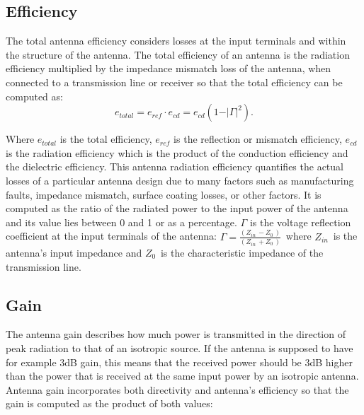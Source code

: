 


\subsection{Efficiency}

The total antenna efficiency considers losses at the input terminals and within the structure of the antenna. The total efficiency of an antenna is the radiation efficiency multiplied by the impedance mismatch loss of the antenna, when connected to a transmission line or receiver so that the total efficiency can be computed as:
\begin{equation}
e_{total}= e_{ref} \cdot e_{cd}= e_{cd} \left( 1- \vert  \Gamma  \vert ^{2} \right).
\end{equation}

Where $e_{total}$ is the total efficiency, $e_{ref}$ is the reflection or mismatch efficiency, $e_{cd}$ is the radiation efficiency which is the product of the conduction efficiency and the dielectric efficiency. This antenna radiation efficiency quantifies the actual losses of a particular antenna design due to many factors such as manufacturing faults, impedance mismatch, surface coating losses, or other factors. It is computed as the ratio of the radiated power to the input power of the antenna and its value lies between 0 and 1 or as a percentage. $\Gamma$ is the voltage reflection coefficient at the input terminals of the antenna:  $\Gamma =\frac{ \left( Z_{in~}- Z_{0~} \right) }{ \left( Z_{in~}+ Z_{0~} \right) }$\  where  $Z_{in~}$ is the antenna’s input impedance and  $Z_{0~}$ is the characteristic impedance of the transmission line.

\subsection{Gain}

The antenna gain describes how much power is transmitted in the direction of peak radiation to that of an isotropic source. If the antenna is supposed to have for example 3dB gain, this means that the received power should be 3dB higher than the power that is received at the same input power by an isotropic antenna. Antenna gain incorporates both directivity and antenna’s efficiency so that the gain is computed as the product of both values: 

